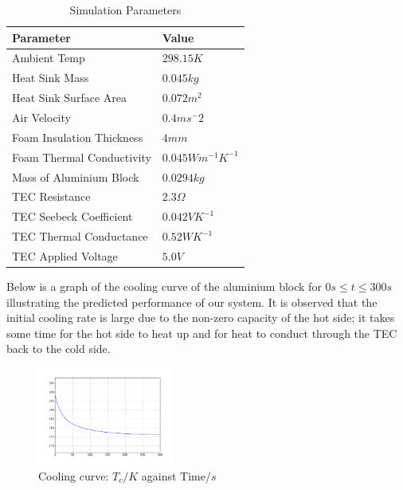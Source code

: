 \documentclass[12pt,a4paper]{IEEEtran}
\begin{document}
	\begin{table}[H]
		\centering
		\begin{tabular}{|l|l|}
			\hline
			Parameter                 & Value   \\ \hline
			Ambient Temp              & $298.15K$  \\ \hline
			Heat Sink Mass            & $0.045kg$ \\ \hline
			Heat Sink Surface Area    & $0.072m^2$ \\ \hline
			Air Velocity              & $0.4ms^-2$       \\ \hline
			Foam Insulation Thickness & $4mm$    \\ \hline
			Foam Thermal Conductivity & $0.045Wm^{-1}K^{-1}$        \\ \hline
			Mass of Aluminium Block   & $0.0294kg$        \\ \hline
			TEC Resistance            & $2.3\Omega$        \\ \hline
			TEC Seebeck Coefficient   & $0.042VK^{-1}$        \\ \hline
			TEC Thermal Conductance   & $0.52WK^{-1}$        \\ \hline
			TEC Applied Voltage       & $5.0V$        \\ \hline
		\end{tabular}
		\caption{Simulation Parameters}
		\label{simulationParameters}
	\end{table}
	
	\pagebreak
	Below is a graph of the cooling curve of the aluminium block for $0s \leq t \leq 300s$ illustrating the predicted performance of our system. It is observed that the initial cooling rate is large due to the non-zero capacity of the hot side; it takes some time for the hot side to heat up and for heat to conduct through the TEC back to the cold side.
	\begin{figure}[H]
		\begin{center}
			\includegraphics[width=0.4\textwidth]{T_c.png}
			\caption{Cooling curve: $T_c/K$ against Time/$s$}
			\label{fig:coolingcurve}
		\end{center}
	\end{figure}
	
\end{document}
